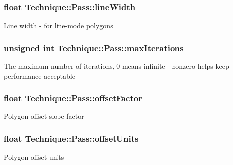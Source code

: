 \subsubsection[{\texorpdfstring{line\+Width}{lineWidth}}]{\setlength{\rightskip}{0pt plus 5cm}float Technique\+::\+Pass\+::line\+Width}\hypertarget{classTechnique_1_1Pass_aa21efec562ec689f362befc6e2c988df}{}\label{classTechnique_1_1Pass_aa21efec562ec689f362befc6e2c988df}
Line width -\/ for line-\/mode polygons 
\subsubsection[{\texorpdfstring{max\+Iterations}{maxIterations}}]{\setlength{\rightskip}{0pt plus 5cm}unsigned int Technique\+::\+Pass\+::max\+Iterations}\hypertarget{classTechnique_1_1Pass_ad7cde7699602c9b3b7e38e09b69cf8d0}{}\label{classTechnique_1_1Pass_ad7cde7699602c9b3b7e38e09b69cf8d0}
The maximum number of iterations, 0 means infinite -\/ nonzero helps keep performance acceptable 
\subsubsection[{\texorpdfstring{offset\+Factor}{offsetFactor}}]{\setlength{\rightskip}{0pt plus 5cm}float Technique\+::\+Pass\+::offset\+Factor}\hypertarget{classTechnique_1_1Pass_a5f08dce49dd118dde86aa84c8421e803}{}\label{classTechnique_1_1Pass_a5f08dce49dd118dde86aa84c8421e803}
Polygon offset slope factor 
\subsubsection[{\texorpdfstring{offset\+Units}{offsetUnits}}]{\setlength{\rightskip}{0pt plus 5cm}float Technique\+::\+Pass\+::offset\+Units}\hypertarget{classTechnique_1_1Pass_a27e27ff105ea013847fa76a0efab9791}{}\label{classTechnique_1_1Pass_a27e27ff105ea013847fa76a0efab9791}
Polygon offset units 
